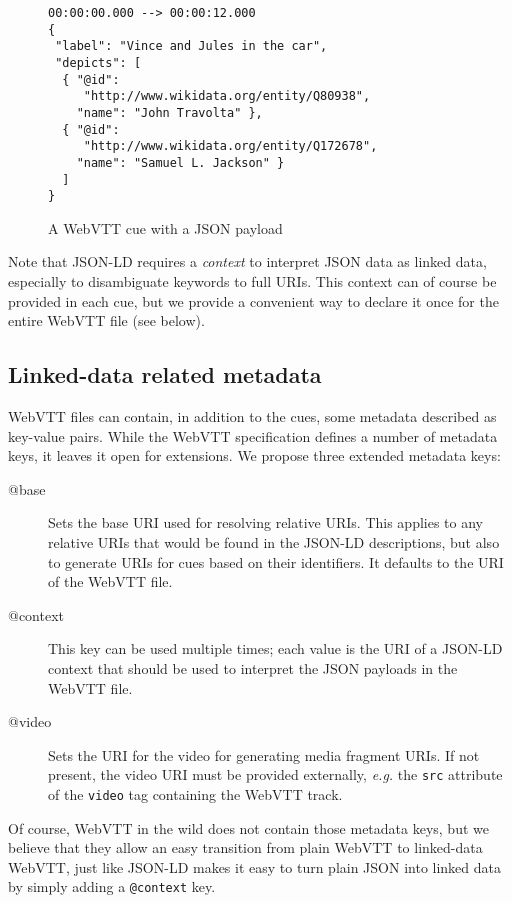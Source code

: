 \documentclass{sig-alternate}
\begin{document}
\begin{figure}
\begin{verbatim}
00:00:00.000 --> 00:00:12.000
{
 "label": "Vince and Jules in the car",
 "depicts": [
  { "@id":
     "http://www.wikidata.org/entity/Q80938",
    "name": "John Travolta" },
  { "@id":
     "http://www.wikidata.org/entity/Q172678",
    "name": "Samuel L. Jackson" }
  ]
}
\end{verbatim}
\label{fig:json-payload}
\caption{A WebVTT cue with a JSON payload}
\end{figure}

Note that JSON-LD requires a \emph{context} to interpret JSON data as linked data,
especially to disambiguate keywords to full URIs.
This context can of course be provided in each cue,
but we provide a convenient way to declare it once for the entire WebVTT file (see below).

\subsection{Linked-data related metadata}

WebVTT files can contain, in addition to the cues, some metadata described as key-value pairs.
While the WebVTT specification defines a number of metadata keys,
it leaves it open for extensions.
We propose three extended metadata keys:

\begin{description}

\item[@base]
Sets the base URI used for resolving relative URIs.
This applies to any relative URIs that would be found in the JSON-LD descriptions,
but also to generate URIs for cues based on their identifiers.
It defaults to the URI of the WebVTT file.

\item[@context]
This key can be used multiple times; each value is the URI of a JSON-LD context
that should be used to interpret the JSON payloads in the WebVTT file.

\item[@video]
Sets the URI for the video for generating media fragment URIs.
If not present, the video URI must be provided externally,
\textit{e.g.} the \texttt{src} attribute of the \texttt{video} tag
containing the WebVTT track.

\end{description}

Of course, WebVTT in the wild does not contain those metadata keys,
but we believe that they allow an easy transition
from plain WebVTT to linked-data WebVTT,
just like JSON-LD makes it easy to turn plain JSON into linked data
by simply adding a \texttt{@context} key.
\end{document}
